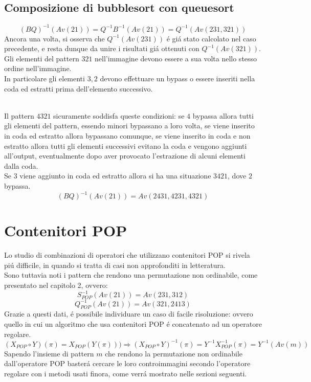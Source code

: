 \subsection*{Composizione di {bubblesort} con {queuesort}}
$$(BQ)^{-1}(Av(21))=Q^{-1}B^{-1}(Av(21))=Q^{-1}(Av(231,321))$$
Ancora una volta, si osserva che $Q^{-1}(Av(231))$ \'e gi\'a stato calcolato nel caso precedente, e resta dunque da unire i risultati gi\'a ottenuti con $Q^{-1}(Av(321))$.\\
Gli elementi del pattern $321$ nell'immagine devono essere a sua volta nello stesso ordine nell'immagine.\\
In particolare gli elementi $3,2$ devono effettuare un bypass o essere inseriti nella coda ed estratti prima dell'elemento successivo.\\\\
\begin{center}
\end{center}
Il pattern $4321$ sicuramente soddisfa queste condizioni: se $4$ bypassa allora tutti gli elementi del pattern, essendo minori bypassano a loro volta, se viene inserito in coda ed estratto allora bypassano comunque, se viene inserito in coda e non estratto allora tutti gli elementi successivi evitano la coda e vengono aggiunti all'output, eventualmente dopo aver provocato l'estrazione di alcuni elementi dalla coda.\\
Se $3$ viene aggiunto in coda ed estratto allora si ha una situazione $3421$, dove $2$ bypassa.\\
$$(BQ)^{-1}(Av(21))=Av(2431,4231,4321)$$
\section*{Contenitori POP}
Lo studio di combinazioni di operatori che utilizzano contenitori POP si rivela pi\'u difficile, in quando si tratta di casi non approfonditi in letteratura.\\
Sono tuttavia noti i pattern che rendono una permutazione non ordinabile, come presentato nel capitolo 2, ovvero:
$$S_{POP}^{-1}(Av(21)) = Av(231,312)$$$$Q_{POP}^{-1}(Av(21))=Av(321,2413)$$
Grazie a questi dati, \'e possibile individuare un caso di facile risoluzione: ovvero quello in cui un algoritmo che usa contenitori POP \'e concatenato ad un operatore regolare.
$$(X_{POP}\circ{Y})(\pi)= X_{POP}(Y(\pi)))\Rightarrow(X_{POP}\circ{Y})^{-1}(\pi) = Y^{-1}X_{POP}^{-1}(\pi)=Y^{-1}(Av(m))$$
Sapendo l'insieme di pattern $m$ che rendono la permutazione non ordinabile dall'operatore POP baster\'a cercare le loro controimmagini secondo l'operatore regolare con i metodi usati finora, come verr\'a mostrato nelle sezioni seguenti.
